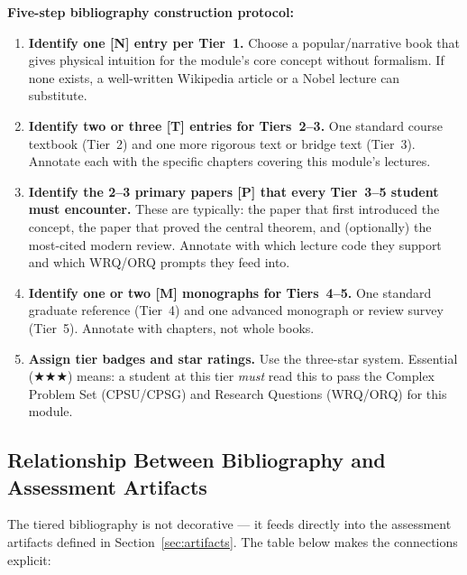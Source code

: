 \documentclass[11pt,a4paper]{article}
\newcommand{\essential}{$\bigstar\bigstar\bigstar$}
\begin{document}
\begin{tcolorbox}[goldbox]
\textbf{Five-step bibliography construction protocol:}

\medskip
\begin{enumerate}[leftmargin=2em,itemsep=6pt]
  \item \textbf{Identify one [N] entry per Tier~1.}
        Choose a popular/narrative book that gives physical intuition for the
        module's core concept without formalism. If none exists, a well-written
        Wikipedia article or a Nobel lecture can substitute.

  \item \textbf{Identify two or three [T] entries for Tiers~2--3.}
        One standard course textbook (Tier~2) and one more rigorous text or
        bridge text (Tier~3). Annotate each with the specific chapters covering
        this module's lectures.

  \item \textbf{Identify the 2--3 primary papers [P] that every Tier~3--5 student
        must encounter.}
        These are typically: the paper that first introduced the concept, the paper
        that proved the central theorem, and (optionally) the most-cited modern
        review. Annotate with which lecture code they support and which WRQ/ORQ
        prompts they feed into.

  \item \textbf{Identify one or two [M] monographs for Tiers~4--5.}
        One standard graduate reference (Tier~4) and one advanced monograph
        or review survey (Tier~5). Annotate with chapters, not whole books.

  \item \textbf{Assign tier badges and star ratings.}
        Use the three-star system. Essential (\essential) means: a student at this
        tier \emph{must} read this to pass the Complex Problem Set (CPSU/CPSG)
        and Research Questions (WRQ/ORQ) for this module.
\end{enumerate}
\end{tcolorbox}

\subsection{Relationship Between Bibliography and Assessment Artifacts}

The tiered bibliography is not decorative --- it feeds directly into the assessment
artifacts defined in Section~\ref{sec:artifacts}. The table below makes the
connections explicit:
\end{document}
